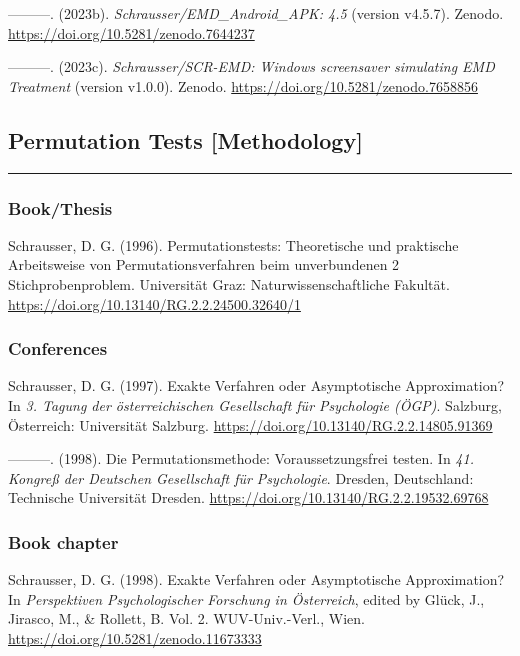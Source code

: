 \documentclass[
]{article}
\begin{document}
---------. (2023b). \emph{Schrausser/EMD\_Android\_APK: 4.5} (version
v4.5.7). Zenodo. \url{https://doi.org/10.5281/zenodo.7644237}

---------. (2023c). \emph{Schrausser/SCR-EMD: Windows screensaver
simulating EMD Treatment} (version v1.0.0). Zenodo.
\url{https://doi.org/10.5281/zenodo.7658856}

\hypertarget{permutation-tests-methodology}{%
\subsection{Permutation Tests
{[}Methodology{]}}\label{permutation-tests-methodology}}

\begin{center}\rule{0.5\linewidth}{0.5pt}\end{center}

\hypertarget{bookthesis}{%
\subsubsection{Book/Thesis}\label{bookthesis}}

Schrausser, D. G. (1996). Permutationstests: Theoretische und praktische
Arbeitsweise von Permutationsverfahren beim unverbundenen 2
Stichprobenproblem. Universität Graz: Naturwissenschaftliche Fakultät.
\url{https://doi.org/10.13140/RG.2.2.24500.32640/1}

\hypertarget{conferences}{%
\subsubsection{Conferences}\label{conferences}}

Schrausser, D. G. (1997). Exakte Verfahren oder Asymptotische
Approximation? In \emph{3. Tagung der österreichischen Gesellschaft für
Psychologie (ÖGP)}. Salzburg, Österreich: Universität Salzburg.
\url{https://doi.org/10.13140/RG.2.2.14805.91369}

---------. (1998). Die Permutationsmethode: Voraussetzungsfrei testen.
In \emph{41. Kongreß der Deutschen Gesellschaft für Psychologie}.
Dresden, Deutschland: Technische Universität Dresden.
\url{https://doi.org/10.13140/RG.2.2.19532.69768}

\hypertarget{book-chapter}{%
\subsubsection{Book chapter}\label{book-chapter}}

Schrausser, D. G. (1998). Exakte Verfahren oder Asymptotische
Approximation? In \emph{Perspektiven Psychologischer Forschung in
Österreich}, edited by Glück, J., Jirasco, M., \& Rollett, B. Vol. 2.
WUV-Univ.-Verl., Wien. \url{https://doi.org/10.5281/zenodo.11673333}
\end{document}
